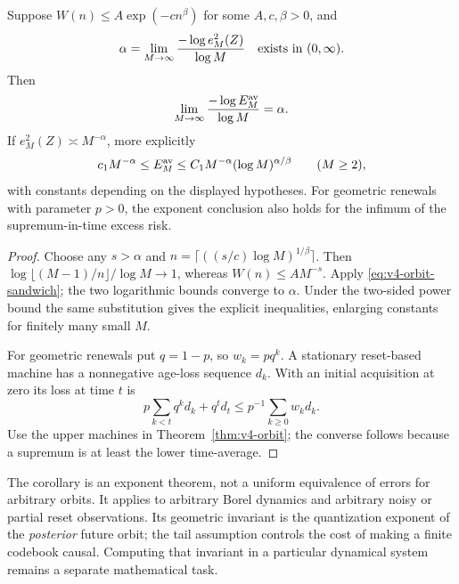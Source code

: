 \begin{corollary}\label{cor:v4-exponent}
Suppose $W(n)\le A\exp(-cn^\beta)$ for some $A,c,\beta>0$, and
\begin{equation}
 \alpha=\lim_{M\to\infty}\frac{-\log e_M^2(Z)}{\log M}
 \quad\hbox{exists in }(0,\infty).
\end{equation}
Then
\begin{equation}
 \lim_{M\to\infty}\frac{-\log E_M^{\rm av}}{\log M}=\alpha.
                                                               \label{eq:v4-exponent}
\end{equation}
If $e_M^2(Z)\asymp M^{-\alpha}$, more explicitly
\[
 c_1M^{-\alpha}\le E_M^{\rm av}
 \le C_1M^{-\alpha}(\log M)^{\alpha/\beta}\qquad(M\ge2),
\]
with constants depending on the displayed hypotheses.
For geometric renewals with parameter $p>0$, the exponent conclusion
also holds for the infimum of the supremum-in-time excess risk.
\end{corollary}
\begin{proof}
Choose any $s>\alpha$ and
$n=\lceil((s/c)\log M)^{1/\beta}\rceil$. Then
$\log\lfloor(M-1)/n\rfloor/\log M\to1$, whereas $W(n)\le AM^{-s}$.
Apply \eqref{eq:v4-orbit-sandwich}; the two logarithmic bounds converge
to $\alpha$. Under the two-sided power bound the same substitution
gives the explicit inequalities, enlarging constants for finitely
many small $M$.

For geometric renewals put $q=1-p$, so $w_k=pq^k$. A stationary
reset-based machine has a nonnegative age-loss sequence $d_k$. With
an initial acquisition at zero its loss at time $t$ is
\[
 p\sum_{k<t}q^kd_k+q^td_t\le p^{-1}\sum_{k\ge0}w_kd_k.
\]
Use the upper machines in Theorem~\ref{thm:v4-orbit}; the converse
follows because a supremum is at least the lower time-average.
\end{proof}

The corollary is an exponent theorem, not a uniform equivalence of
errors for arbitrary orbits. It applies to arbitrary Borel dynamics
and arbitrary noisy or partial reset observations. Its geometric
invariant is the quantization exponent of the \emph{posterior} future
orbit; the tail assumption controls the cost of making a finite
codebook causal. Computing that invariant in a particular dynamical
system remains a separate mathematical task.

